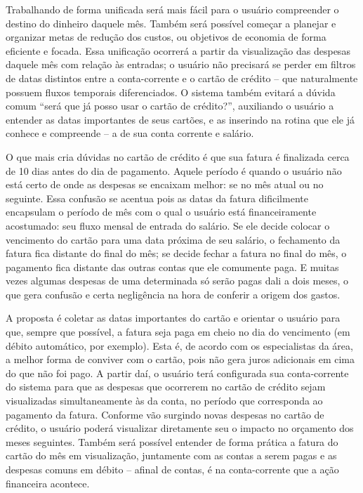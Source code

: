 \documentclass[a4paper]{abnt}
\begin{document}
Trabalhando de forma unificada será mais fácil para o usuário compreender o destino do dinheiro daquele mês. Também será possível começar a planejar e organizar metas de redução dos custos, ou objetivos de economia de forma eficiente e focada. Essa unificação ocorrerá a partir da visualização das despesas daquele mês com relação às entradas; o usuário não precisará se perder em filtros de datas distintos entre a conta-corrente e o cartão de crédito -- que naturalmente possuem fluxos temporais diferenciados. O sistema também evitará a dúvida comum ``será que já posso usar o cartão de crédito?'', auxiliando o usuário a entender as datas importantes de seus cartões, e as inserindo na rotina que ele já conhece e compreende -- a de sua conta corrente e salário.

O que mais cria dúvidas no cartão de crédito é que sua fatura é finalizada cerca de 10 dias antes do dia de pagamento. Aquele período é quando o usuário não está certo de onde as despesas se encaixam melhor: se no mês atual ou no seguinte. Essa confusão se acentua pois as datas da fatura dificilmente encapsulam o período de mês com o qual o usuário está financeiramente acostumado: seu fluxo mensal de entrada do salário. Se ele decide colocar o vencimento do cartão para uma data próxima de seu salário, o fechamento da fatura fica distante do final do mês; se decide fechar a fatura no final do mês, o pagamento fica distante das outras contas que ele comumente paga. E muitas vezes algumas despesas de uma determinada só serão pagas dali a dois meses, o que gera confusão e certa negligência na hora de conferir a origem dos gastos.

A proposta é coletar as datas importantes do cartão e orientar o usuário para que, sempre que possível, a fatura seja paga em cheio no dia do vencimento (em débito automático, por exemplo). Esta é, de acordo com os especialistas da área, a melhor forma de conviver com o cartão, pois não gera juros adicionais em cima do que não foi pago. A partir daí, o usuário terá configurada sua conta-corrente do sistema para que as despesas que ocorrerem no cartão de crédito sejam visualizadas simultaneamente às da conta, no período que corresponda ao pagamento da fatura. Conforme vão surgindo novas despesas no cartão de crédito, o usuário poderá visualizar diretamente seu o impacto no orçamento dos meses seguintes. Também será possível entender de forma prática a fatura do cartão do mês em visualização, juntamente com as contas a serem pagas e as despesas comuns em débito -- afinal de contas, é na conta-corrente
que a ação financeira acontece.
\end{document}
